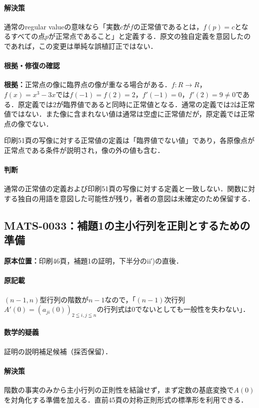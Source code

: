 \documentclass[a4paper,10pt]{ltjsarticle}
\begin{document}
\paragraph{解決策}通常のregular valueの意味なら「実数$c$が$f$の正常値であるとは，$f(p)=c$となるすべての点$p$が正常点であること」と定義する．原文の独自定義を意図したのであれば，この変更は単純な誤植訂正ではない．

\paragraph{根拠・修復の確認}\textbf{根拠：}正常点の像に臨界点の像が重なる場合がある．$f:R\to R$，$f(x)=x^3-3x$では$f(-1)=f(2)=2$，$f'(-1)=0$，$f'(2)=9\ne0$である．原定義では$2$が臨界値であると同時に正常値となる．通常の定義では$2$は正常値ではない．また像に含まれない値は通常は空虚に正常値だが，原定義では正常点の像でない．

印刷51頁の写像に対する正常値の定義は「臨界値でない値」であり，各原像点が正常点である条件が説明され，像の外の値も含む．

\paragraph{判断}通常の正常値の定義および印刷51頁の写像に対する定義と一致しない．関数に対する独自の用語を意図した可能性が残り，著者の意図は未確定のため保留する．


\subsection*{MATS-0033：補題1の主小行列を正則とするための準備}\label{math:MATS-0033}
\noindent\textbf{原本位置：}印刷46頁，補題1の証明，下半分のii′)の直後．

\paragraph{原記載}$(n-1,n)$型行列の階数が$n-1$なので，「$(n-1)$次行列$A'(0)=(a_{ji}(0))_{2\leqq i,j\leqq n}$の行列式は0でないとしても一般性を失わない」．

\paragraph{数学的疑義}証明の説明補足候補（採否保留）．

\paragraph{解決策}階数の事実のみから主小行列の正則性を結論せず，まず定数の基底変換で$A(0)$を対角化する準備を加える．直前45頁の対称正則形式の標準形を利用できる．
\end{document}
